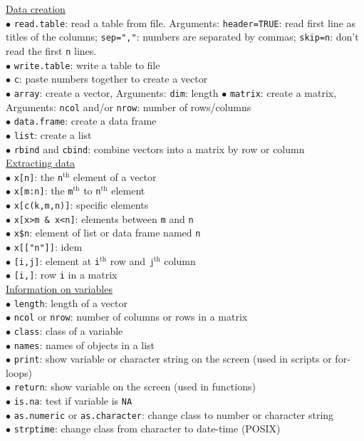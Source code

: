 \documentclass[a4paper,11pt,twocolumn,tablecaptionabove]{scrartcl} %
\begin{document}
\noindent \underline{Data creation}\\
$\bullet$ \texttt{read.table}: read a table from file. Arguments: \texttt{header=TRUE}: read first line as titles of the columns; \texttt{sep=","}: numbers are separated by commas; \texttt{skip=n}: don't read the first \texttt{n} lines.\\
$\bullet$ \texttt{write.table}: write a table to file\\
$\bullet$ \texttt{c}: paste numbers together to create a vector\\
$\bullet$ \texttt{array}: create a vector, Arguments: \texttt{dim}: length
$\bullet$ \texttt{matrix}: create a matrix, Arguments: \texttt{ncol} and/or \texttt{nrow}: number of rows/columns\\
$\bullet$ \texttt{data.frame}: create a data frame\\
$\bullet$ \texttt{list}: create a list\\
$\bullet$ \texttt{rbind} and \texttt{cbind}: combine vectors into a matrix by row or column\\

\noindent \underline{Extracting data}\\
$\bullet$ \texttt{x[n]}: the \texttt{n}$\mathrm{^{th}}$ element of a vector\\
$\bullet$ \texttt{x[m:n]}: the \texttt{m}$\mathrm{^{th}}$ to \texttt{n}$\mathrm{^{th}}$ element\\
$\bullet$ \texttt{x[c(k,m,n)]}: specific elements\\
$\bullet$ \texttt{x[x>m \& x<n]}: elements between \texttt{m} and \texttt{n}\\
$\bullet$ \verb!x$n!:  element of list or data frame named \texttt{n}\\  %
$\bullet$ \texttt{x[["n"]]}: idem\\
$\bullet$ \texttt{[i,j]}: element at \texttt{i}$\mathrm{^{th}}$ row and\texttt{ }j$\mathrm{^{th}}$ column \\
$\bullet$ \texttt{[i,]}: row \texttt{i} in a matrix\\

\noindent \underline{Information on variables}\\
$\bullet$ \texttt{length}: length of a vector\\
$\bullet$ \texttt{ncol} or \texttt{nrow}: number of columns or rows in a matrix\\
$\bullet$ \texttt{class}: class of a variable \\
$\bullet$ \texttt{names}: names of objects in a list \\
$\bullet$ \texttt{print}: show variable or character string on the screen (used in scripts or for-loops) \\
$\bullet$ \texttt{return}: show variable on the screen (used in functions) \\
$\bullet$ \texttt{is.na}: test if variable is \texttt{NA}\\
$\bullet$ \texttt{as.numeric} or \texttt{as.character}: change class to number or character string\\
$\bullet$ \texttt{strptime}: change class from character to date-time (POSIX)\\
\end{document}
